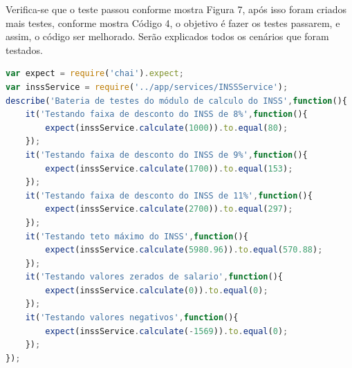 \par Verifica-se que o teste passou conforme mostra Figura 7, após isso foram criados mais testes, conforme mostra Código 4, o objetivo é fazer os testes passarem, e assim, o código ser melhorado. Serão explicados todos os cenários que foram testados.

\newpage

\begin{lstlisting}[language=JavaScript, caption={[Criação de todos os testes INSS.]{Criação de todos os testes INSS.  \textbf{Fonte:} Elaborado pelos autores.}}]
var expect = require('chai').expect;
var inssService = require('../app/services/INSSService');
describe('Bateria de testes do módulo de calculo do INSS',function(){    
    it('Testando faixa de desconto do INSS de 8%',function(){
        expect(inssService.calculate(1000)).to.equal(80);
    });
    it('Testando faixa de desconto do INSS de 9%',function(){
        expect(inssService.calculate(1700)).to.equal(153);
    });
    it('Testando faixa de desconto do INSS de 11%',function(){
        expect(inssService.calculate(2700)).to.equal(297);
    });
    it('Testando teto máximo do INSS',function(){
        expect(inssService.calculate(5980.96)).to.equal(570.88);
    });
    it('Testando valores zerados de salario',function(){
        expect(inssService.calculate(0)).to.equal(0);
    });
    it('Testando valores negativos',function(){
        expect(inssService.calculate(-1569)).to.equal(0);
    });
});

\end{lstlisting}

